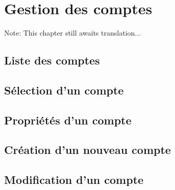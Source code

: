 
\chapter{Gestion des comptes\label{accounts} }

Note: This chapter still awaits translation...

\section{Liste des comptes\label{accounts-list}}


\section{Sélection d'un compte\label{accounts-selection}}

\section{Propriétés d'un compte\label{accounts-properties}}



\section{Création d'un nouveau compte\label{accounts-new}}



\section{Modification d'un compte\label{accounts-modify} }



